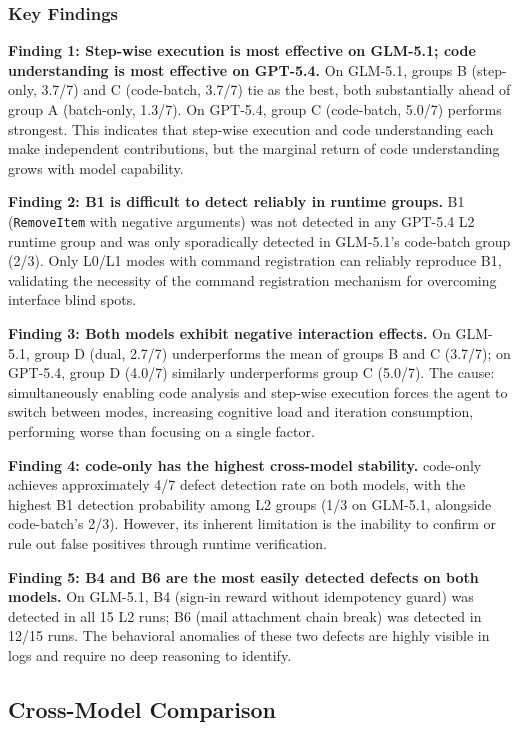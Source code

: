 \documentclass[sigconf,nonacm]{acmart}
\begin{document}
\subsubsection{Key Findings}

\textbf{Finding 1: Step-wise execution is most effective on GLM-5.1; code understanding is most effective on GPT-5.4.} On GLM-5.1, groups B (step-only, 3.7/7) and C (code-batch, 3.7/7) tie as the best, both substantially ahead of group A (batch-only, 1.3/7). On GPT-5.4, group C (code-batch, 5.0/7) performs strongest. This indicates that step-wise execution and code understanding each make independent contributions, but the marginal return of code understanding grows with model capability.

\textbf{Finding 2: B1 is difficult to detect reliably in runtime groups.} B1 (\texttt{RemoveItem} with negative arguments) was not detected in any GPT-5.4 L2 runtime group and was only sporadically detected in GLM-5.1's code-batch group (2/3). Only L0/L1 modes with command registration can reliably reproduce B1, validating the necessity of the command registration mechanism for overcoming interface blind spots.

\textbf{Finding 3: Both models exhibit negative interaction effects.} On GLM-5.1, group D (dual, 2.7/7) underperforms the mean of groups B and C (3.7/7); on GPT-5.4, group D (4.0/7) similarly underperforms group C (5.0/7). The cause: simultaneously enabling code analysis and step-wise execution forces the agent to switch between modes, increasing cognitive load and iteration consumption, performing worse than focusing on a single factor.

\textbf{Finding 4: code-only has the highest cross-model stability.} code-only achieves approximately 4/7 defect detection rate on both models, with the highest B1 detection probability among L2 groups (1/3 on GLM-5.1, alongside code-batch's 2/3). However, its inherent limitation is the inability to confirm or rule out false positives through runtime verification.

\textbf{Finding 5: B4 and B6 are the most easily detected defects on both models.} On GLM-5.1, B4 (sign-in reward without idempotency guard) was detected in all 15 L2 runs; B6 (mail attachment chain break) was detected in 12/15 runs. The behavioral anomalies of these two defects are highly visible in logs and require no deep reasoning to identify.

\subsection{Cross-Model Comparison}
\end{document}

